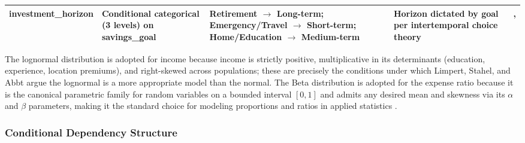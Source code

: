 \documentclass[journal]{./IEEE/IEEEtran}
\begin{document}
\begin{table}[t]
\begin{tabular}{|l|p{2.8cm}|p{3.6cm}|p{5.0cm}|c|}
        \hline
        investment\_horizon & Conditional categorical (3 levels) on savings\_goal & Retirement $\to$ Long-term; Emergency/Travel $\to$ Short-term; Home/Education $\to$ Medium-term & Horizon dictated by goal per intertemporal choice theory & \cite{ref64}, \cite{ref84} \\
        \hline
    \end{tabular}
\end{table}

The lognormal distribution is adopted for income because income is strictly positive, multiplicative in its determinants (education, experience, location premiums), and right-skewed across populations; these are precisely the conditions under which Limpert, Stahel, and Abbt \cite{ref54} argue the lognormal is a more appropriate model than the normal. The Beta distribution is adopted for the expense ratio because it is the canonical parametric family for random variables on a bounded interval $[0,1]$ and admits any desired mean and skewness via its $\alpha$ and $\beta$ parameters, making it the standard choice for modeling proportions and ratios in applied statistics \cite{ref54}.

\subsubsection{Conditional Dependency Structure}
\end{document}
